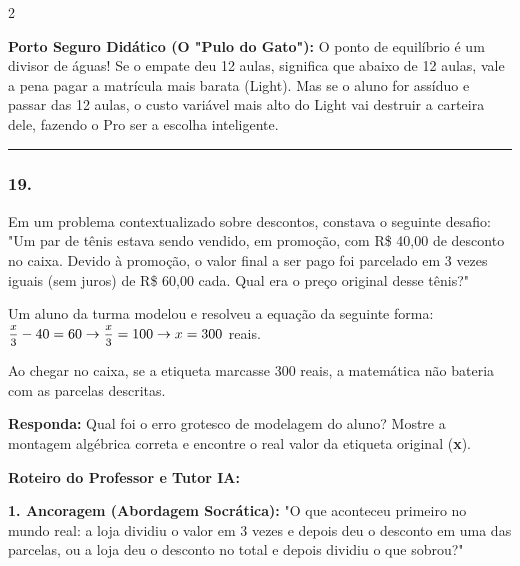 \begin{multicols*}{2}
    \begin{boxexplicacao}
    \textbf{Porto Seguro Didático (O "Pulo do Gato"):} O ponto de equilíbrio é um divisor de águas! Se o empate deu 12 aulas, significa que abaixo de 12 aulas, vale a pena pagar a matrícula mais barata (Light). Mas se o aluno for assíduo e passar das 12 aulas, o custo variável mais alto do Light vai destruir a carteira dele, fazendo o Pro ser a escolha inteligente.
    \end{boxexplicacao}
\fi

\par\vspace{\espacoQuestao}


\noindent\textcolor{CorLinha}{\rule{\linewidth}{0.5pt}} 
\par\vspace{\espacoPreQuestao}
\subsubsection*{19.} 
\begin{enunciadoLiteral}
Em um problema contextualizado sobre descontos, constava o seguinte desafio: 
"Um par de tênis estava sendo vendido, em promoção, com R\$ 40,00 de desconto no caixa. Devido à promoção, o valor final a ser pago foi parcelado em 3 vezes iguais (sem juros) de R\$ 60,00 cada. Qual era o preço original desse tênis?"

Um aluno da turma modelou e resolveu a equação da seguinte forma:
$ \mfrac{x}{3} - 40 = 60 \rightarrow \mfrac{x}{3} = 100 \rightarrow x = 300 $ reais.

Ao chegar no caixa, se a etiqueta marcasse 300 reais, a matemática não bateria com as parcelas descritas.

\begin{boxresponda}
\textbf{Responda:} Qual foi o erro grotesco de modelagem do aluno? Mostre a montagem algébrica correta e encontre o real valor da etiqueta original (\textbf{x}).
\end{boxresponda}
\end{enunciadoLiteral}

\ifgabarito
    \begin{tcolorbox}[colback=CorTitUm!5, colframe=CorTitUm, boxrule=1pt, arc=4pt, left=6pt, right=6pt, top=6pt, bottom=6pt]
    \small\textbf{\textcolor{CorTitUm}{Roteiro do Professor e Tutor IA:}}\par\vspace{0.1cm}
    \color{CinzaEscuro}
    \textbf{1. Ancoragem (Abordagem Socrática):} "O que aconteceu primeiro no mundo real: a loja dividiu o valor em 3 vezes e depois deu o desconto em uma das parcelas, ou a loja deu o desconto no total e depois dividiu o que sobrou?"\par\vspace{0.1cm}
    

\end{tcolorbox}
\end{multicols*}
